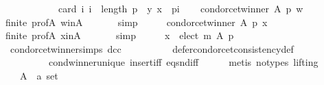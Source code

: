 \begin{isabellebody}
\ \ \ \ \ \ \ \ \ \ \ \ card\ {\isacharbraceleft}{\kern0pt}i{\isachardot}{\kern0pt}\ i\ {\isacharless}{\kern0pt}\ length\ p\ {\isasymand}\ {\isacharparenleft}{\kern0pt}y{\isacharcomma}{\kern0pt}\ x{\isacharparenright}{\kern0pt}\ {\isasymin}\ {\isacharparenleft}{\kern0pt}p{\isacharbang}{\kern0pt}i{\isacharparenright}{\kern0pt}{\isacharbraceright}{\kern0pt}{\isachardoublequoteclose}\isanewline
\ \ \isamarkupfalse%
\ {\isachardoublequoteopen}condorcet{\isacharunderscore}{\kern0pt}winner\ A\ p\ w{\isachardoublequoteclose}\isanewline
\ \ \ \ \isamarkupfalse%
\ finite\ prof{\isacharunderscore}{\kern0pt}A\ w{\isacharunderscore}{\kern0pt}in{\isacharunderscore}{\kern0pt}A\ {\isachardoublequoteopen}{}{\isachardoublequoteclose}\isanewline
\ \ \ \ \isamarkupfalse%
\ simp\isanewline
\ \ \isamarkupfalse%
\ \isamarkupfalse%
\ {\isachardoublequoteopen}condorcet{\isacharunderscore}{\kern0pt}winner\ A\ p\ x{\isachardoublequoteclose}\isanewline
\ \ \ \ \isamarkupfalse%
\ finite\ prof{\isacharunderscore}{\kern0pt}A\ x{\isacharunderscore}{\kern0pt}in{\isacharunderscore}{\kern0pt}A\ {\isachardoublequoteopen}{}{\isachardoublequoteclose}\isanewline
\ \ \ \ \isamarkupfalse%
\ simp\isanewline
\ \ \isamarkupfalse%
\ \isamarkupfalse%
\ {\isachardoublequoteopen}x\ {\isasymin}\ elect\ m\ A\ p{\isachardoublequoteclose}\isanewline
\ \ \ \ \isamarkupfalse%
\ {\isachardoublequoteopen}{}{\isachardoublequoteclose}\ condorcet{\isacharunderscore}{\kern0pt}winner{\isachardot}{\kern0pt}simps\ dcc\isanewline
\ \ \ \ \ \ \ \ \ \ defer{\isacharunderscore}{\kern0pt}condorcet{\isacharunderscore}{\kern0pt}consistency{\isacharunderscore}{\kern0pt}def\isanewline
\ \ \ \ \ \ \ \ \ \ cond{\isacharunderscore}{\kern0pt}winner{\isacharunderscore}{\kern0pt}unique{}\ insert{\isacharunderscore}{\kern0pt}iff\ eq{\isacharunderscore}{\kern0pt}snd{\isacharunderscore}{\kern0pt}iff\isanewline
\ \ \ \ \isamarkupfalse%
\ {\isacharparenleft}{\kern0pt}metis\ {\isacharparenleft}{\kern0pt}no{\isacharunderscore}{\kern0pt}types{\isacharcomma}{\kern0pt}\ lifting{\isacharparenright}{\kern0pt}{\isacharparenright}{\kern0pt}\isanewline
{}\isamarkupfalse%
\isanewline
\ \ \isamarkupfalse%
\isanewline
\ \ \ \ A\ {\isacharcolon}{\kern0pt}{\isacharcolon}{\kern0pt}\ {\isachardoublequoteopen}{\isacharprime}{\kern0pt}a\ set{\isachardoublequoteclose}\ \isanewline

\end{isabellebody}
